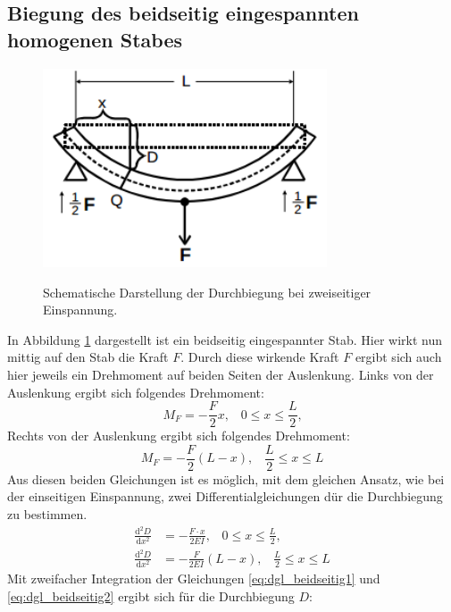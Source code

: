 \documentclass[
  bibliography=totoc,     %
  captions=tableheading,  %
  titlepage=firstiscover, %
]{scrartcl}
\begin{document}
\subsection{Biegung des beidseitig eingespannten homogenen Stabes}
\begin{figure}[H]
    \centering
    \caption{Schematische Darstellung der Durchbiegung bei zweiseitiger Einspannung.}
    \includegraphics[width=0.75\textwidth]{V1032.png}
    \label{fig:1032}
\end{figure}
In Abbildung \ref{fig:1032} dargestellt ist ein beidseitig eingespannter Stab.
Hier wirkt nun mittig auf den Stab die Kraft $F$. Durch diese wirkende Kraft $F$
ergibt sich auch hier jeweils ein Drehmoment auf beiden Seiten der Auslenkung.
Links von der Auslenkung ergibt sich folgendes Drehmoment:
\begin{equation}
	M_F=-\frac{F}{2}x, \;\;\; 0\leqslant  x\leqslant\frac{L}{2}\text{,}
\label{eq:Drehmoment_links}
\end{equation}
Rechts von der Auslenkung ergibt sich folgendes Drehmoment:
\begin{equation}
	M_F=-\frac{F}{2}(L-x), \;\;\; \frac{L}{2}\leqslant  x\leqslant L
\end{equation}
Aus diesen beiden Gleichungen ist es möglich, mit dem gleichen Ansatz, wie bei
der einseitigen Einspannung, zwei Differentialgleichungen dür die Durchbiegung
zu bestimmen.
\begin{align}
	\frac{\mathup{d}^2D}{\mathup{d}x^2}&=-\frac{F\cdot x}{2EI}, \;\;\; 0\leqslant x\leqslant\frac{L}{2}\text{,}
    \label{eq:dgl_beidseitig1} \\
	\frac{\mathup{d}^2D}{\mathup{d}x^2}&=-\frac{F}{2EI}(L-x), \;\;\; \frac{L}{2}\leqslant x\leqslant L
	\label{eq:dgl_beidseitig2}
\end{align}
Mit zweifacher Integration der Gleichungen \ref{eq:dgl_beidseitig1} und
\ref{eq:dgl_beidseitig2} ergibt sich für die Durchbiegung $D$:
\end{document}

